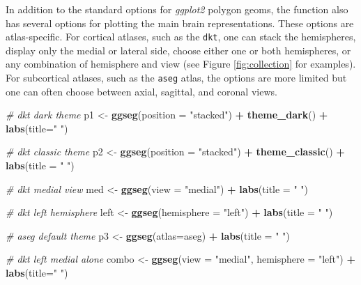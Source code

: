 \documentclass[fleqn,10pt]{wlpeerj} %
\newenvironment{Shaded}{\begin{snugshade}}{\end{snugshade}}
\newcommand{\CommentTok}[1]{\textcolor[rgb]{0.56,0.35,0.01}{\textit{#1}}}
\newcommand{\DataTypeTok}[1]{\textcolor[rgb]{0.13,0.29,0.53}{#1}}
\newcommand{\KeywordTok}[1]{\textcolor[rgb]{0.13,0.29,0.53}{\textbf{#1}}}
\newcommand{\NormalTok}[1]{#1}
\newcommand{\OperatorTok}[1]{\textcolor[rgb]{0.81,0.36,0.00}{\textbf{#1}}}
\newcommand{\StringTok}[1]{\textcolor[rgb]{0.31,0.60,0.02}{#1}}
\begin{document}
In addition to the standard options for \emph{ggplot2} polygon geoms, the function also has several options for plotting the main brain representations.
These options are atlas-specific.
For cortical atlases, such as the \texttt{dkt}, one can stack the hemispheres, display only the medial or lateral side, choose either one or both hemispheres, or any combination of hemisphere and view (see Figure \ref{fig:collection} for examples).
For subcortical atlases, such as the \texttt{aseg} atlas, the options are more limited but one can often choose between axial, sagittal, and coronal views.

\begin{Shaded}
\begin{Highlighting}[]
\CommentTok{\# dkt dark theme}
\NormalTok{p1 <{-}}\StringTok{ }\KeywordTok{ggseg}\NormalTok{(}\DataTypeTok{position =} \StringTok{"stacked"}\NormalTok{) }\OperatorTok{+}
\StringTok{  }\KeywordTok{theme\_dark}\NormalTok{() }\OperatorTok{+}
\StringTok{  }\KeywordTok{labs}\NormalTok{(}\DataTypeTok{title=}\StringTok{" "}\NormalTok{)}

\CommentTok{\# dkt classic theme}
\NormalTok{p2 <{-}}\StringTok{ }\KeywordTok{ggseg}\NormalTok{(}\DataTypeTok{position =} \StringTok{"stacked"}\NormalTok{) }\OperatorTok{+}
\StringTok{  }\KeywordTok{theme\_classic}\NormalTok{() }\OperatorTok{+}
\StringTok{  }\KeywordTok{labs}\NormalTok{(}\DataTypeTok{title =} \StringTok{" "}\NormalTok{)}

\CommentTok{\# dkt medial view}
\NormalTok{med <{-}}\StringTok{ }\KeywordTok{ggseg}\NormalTok{(}\DataTypeTok{view =} \StringTok{"medial"}\NormalTok{) }\OperatorTok{+}
\StringTok{  }\KeywordTok{labs}\NormalTok{(}\DataTypeTok{title =} \StringTok{" "}\NormalTok{)}

\CommentTok{\# dkt left hemisphere}
\NormalTok{left <{-}}\StringTok{ }\KeywordTok{ggseg}\NormalTok{(}\DataTypeTok{hemisphere =} \StringTok{"left"}\NormalTok{) }\OperatorTok{+}
\StringTok{  }\KeywordTok{labs}\NormalTok{(}\DataTypeTok{title =} \StringTok{" "}\NormalTok{)}

\CommentTok{\# aseg default theme}
\NormalTok{p3 <{-}}\StringTok{ }\KeywordTok{ggseg}\NormalTok{(}\DataTypeTok{atlas=}\NormalTok{aseg) }\OperatorTok{+}
\StringTok{  }\KeywordTok{labs}\NormalTok{(}\DataTypeTok{title =} \StringTok{" "}\NormalTok{)}

\CommentTok{\# dkt left medial alone}
\NormalTok{combo <{-}}\StringTok{ }\KeywordTok{ggseg}\NormalTok{(}\DataTypeTok{view =} \StringTok{"medial"}\NormalTok{,}
               \DataTypeTok{hemisphere =} \StringTok{"left"}\NormalTok{) }\OperatorTok{+}
\StringTok{  }\KeywordTok{labs}\NormalTok{(}\DataTypeTok{title=}\StringTok{" "}\NormalTok{)}


\end{Highlighting}
\end{Shaded}
\end{document}
